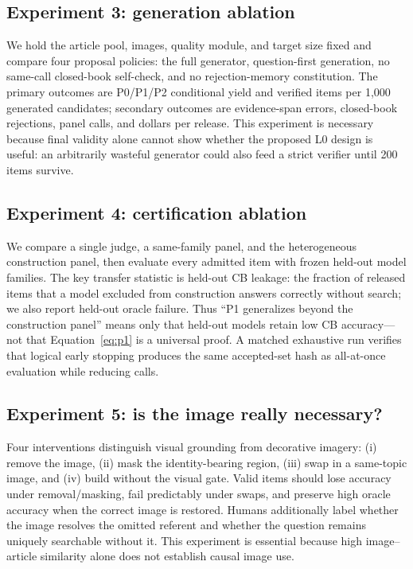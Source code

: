 \documentclass{article}
\begin{document}
\subsection{Experiment 3: generation ablation}
We hold the article pool, images, quality module, and target size fixed and
compare four proposal policies: the full generator, question-first generation,
no same-call closed-book self-check, and no rejection-memory constitution.
The primary outcomes are P0/P1/P2 conditional yield and verified items per
1,000 generated candidates; secondary outcomes are evidence-span errors,
closed-book rejections, panel calls, and dollars per release.
This experiment is necessary because final validity alone cannot show whether
the proposed L0 design is useful: an arbitrarily wasteful generator could also
feed a strict verifier until 200 items survive.

\subsection{Experiment 4: certification ablation}
We compare a single judge, a same-family panel, and the heterogeneous
construction panel, then evaluate every admitted item with frozen held-out
model families.
The key transfer statistic is held-out CB leakage: the fraction of released
items that a model excluded from construction answers correctly without
search; we also report held-out oracle failure.
Thus ``P1 generalizes beyond the construction panel'' means only that held-out
models retain low CB accuracy---not that Equation~\ref{eq:p1} is a universal
proof.
A matched exhaustive run verifies that logical early stopping produces the
same accepted-set hash as all-at-once evaluation while reducing calls.

\subsection{Experiment 5: is the image really necessary?}
Four interventions distinguish visual grounding from decorative imagery:
(i) remove the image, (ii) mask the identity-bearing region, (iii) swap in a
same-topic image, and (iv) build without the visual gate.
Valid items should lose accuracy under removal/masking, fail predictably under
swaps, and preserve high oracle accuracy when the correct image is restored.
Humans additionally label whether the image resolves the omitted referent and
whether the question remains uniquely searchable without it.
This experiment is essential because high image--article similarity alone does
not establish causal image use.
\end{document}
